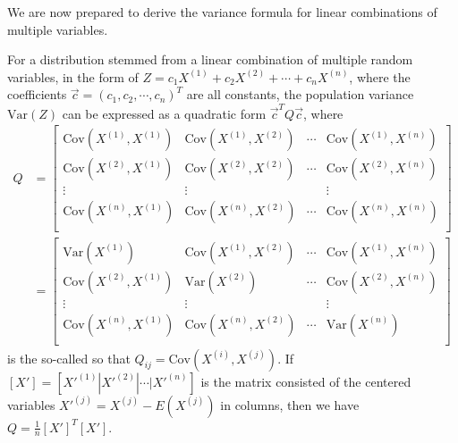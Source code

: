 We are now prepared to derive the variance formula for linear combinations of multiple variables.
\begin{proper}
\label{proper:variancemul}
For a distribution stemmed from a linear combination of multiple random variables, in the form of $Z = c_1X^{(1)} + c_2X^{(2)} + \cdots + c_nX^{(n)}$, where the coefficients $\vec{c} = (c_1, c_2, \cdots, c_n)^T$ are all constants, the population variance $\text{Var}(Z)$ can be expressed as a quadratic form $\vec{c}^TQ\vec{c}$, where
\begin{align*}
Q &=
\begin{bmatrix}
\text{Cov}(X^{(1)}, X^{(1)}) & \text{Cov}(X^{(1)}, X^{(2)}) & \cdots & \text{Cov}(X^{(1)}, X^{(n)}) \\
\text{Cov}(X^{(2)}, X^{(1)}) & \text{Cov}(X^{(2)}, X^{(2)}) & \cdots & \text{Cov}(X^{(2)}, X^{(n)}) \\
\vdots & \vdots &  & \vdots \\
\text{Cov}(X^{(n)}, X^{(1)}) & \text{Cov}(X^{(n)}, X^{(2)}) & \cdots & \text{Cov}(X^{(n)}, X^{(n)}) \\
\end{bmatrix} \\
&=
\begin{bmatrix}
\text{Var}(X^{(1)}) & \text{Cov}(X^{(1)}, X^{(2)}) & \cdots & \text{Cov}(X^{(1)}, X^{(n)}) \\
\text{Cov}(X^{(2)}, X^{(1)}) & \text{Var}(X^{(2)}) & \cdots & \text{Cov}(X^{(2)}, X^{(n)}) \\
\vdots & \vdots &  & \vdots \\
\text{Cov}(X^{(n)}, X^{(1)}) & \text{Cov}(X^{(n)}, X^{(2)}) & \cdots & \text{Var}(X^{(n)}) \\
\end{bmatrix} 
\end{align*}
is the so-called  so that $Q_{ij} = \text{Cov}(X^{(i)}, X^{(j)})$. If $[X'] = [X'^{(1)}|X'^{(2)}|\cdots|X'^{(n)}]$ is the matrix consisted of the centered variables $X'^{(j)} = X^{(j)} - E(X^{(j)})$ in columns, then we have $Q = \frac{1}{n}[X']^T[X']$.
\end{proper}
